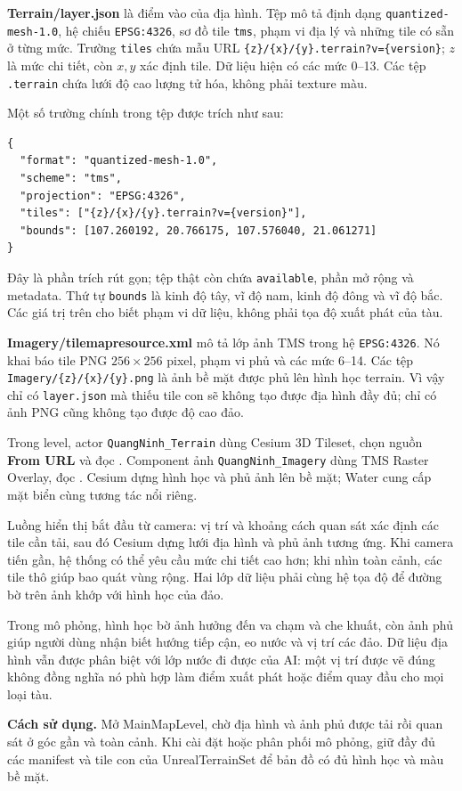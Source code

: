 \documentclass[11pt,a4paper,oneside]{report}
\newcommand{\howto}[1]{\par\smallskip\noindent\textbf{Cách sử dụng.} #1\par}
\begin{document}
\textbf{Terrain/layer.json} là điểm vào của địa hình. Tệp mô tả định dạng \texttt{quantized-mesh-1.0}, hệ chiếu \texttt{EPSG:4326}, sơ đồ tile \texttt{tms}, phạm vi địa lý và những tile có sẵn ở từng mức. Trường \texttt{tiles} chứa mẫu URL \verb|{z}/{x}/{y}.terrain?v={version}|; $z$ là mức chi tiết, còn $x,y$ xác định tile. Dữ liệu hiện có các mức 0--13. Các tệp \texttt{.terrain} chứa lưới độ cao lượng tử hóa, không phải texture màu.\cite{quantized}

Một số trường chính trong tệp được trích như sau:
\begin{lstlisting}
{
  "format": "quantized-mesh-1.0",
  "scheme": "tms",
  "projection": "EPSG:4326",
  "tiles": ["{z}/{x}/{y}.terrain?v={version}"],
  "bounds": [107.260192, 20.766175, 107.576040, 21.061271]
}
\end{lstlisting}
Đây là phần trích rút gọn; tệp thật còn chứa \texttt{available}, phần mở rộng và metadata. Thứ tự \texttt{bounds} là kinh độ tây, vĩ độ nam, kinh độ đông và vĩ độ bắc. Các giá trị trên cho biết phạm vi dữ liệu, không phải tọa độ xuất phát của tàu.

\textbf{Imagery/tilemapresource.xml} mô tả lớp ảnh TMS trong hệ \texttt{EPSG:4326}. Nó khai báo tile PNG $256\times256$ pixel, phạm vi phủ và các mức 6--14. Các tệp \texttt{Imagery/\{z\}/\{x\}/\{y\}.png} là ảnh bề mặt được phủ lên hình học terrain. Vì vậy chỉ có \texttt{layer.json} mà thiếu tile con sẽ không tạo được địa hình đầy đủ; chỉ có ảnh PNG cũng không tạo được độ cao đảo.

Trong level, actor \texttt{QuangNinh\_Terrain} dùng Cesium 3D Tileset, chọn nguồn \textbf{From URL} và đọc . Component ảnh \texttt{QuangNinh\_Imagery} dùng TMS Raster Overlay, đọc . Cesium dựng hình học và phủ ảnh lên bề mặt; Water cung cấp mặt biển cùng tương tác nổi riêng.\cite{cesiumfaq}

Luồng hiển thị bắt đầu từ camera: vị trí và khoảng cách quan sát xác định các tile cần tải, sau đó Cesium dựng lưới địa hình và phủ ảnh tương ứng. Khi camera tiến gần, hệ thống có thể yêu cầu mức chi tiết cao hơn; khi nhìn toàn cảnh, các tile thô giúp bao quát vùng rộng. Hai lớp dữ liệu phải cùng hệ tọa độ để đường bờ trên ảnh khớp với hình học của đảo.

Trong mô phỏng, hình học bờ ảnh hưởng đến va chạm và che khuất, còn ảnh phủ giúp người dùng nhận biết hướng tiếp cận, eo nước và vị trí các đảo. Dữ liệu địa hình vẫn được phân biệt với lớp nước đi được của AI: một vị trí được vẽ đúng không đồng nghĩa nó phù hợp làm điểm xuất phát hoặc điểm quay đầu cho mọi loại tàu.
\howto{Mở MainMapLevel, chờ địa hình và ảnh phủ được tải rồi quan sát ở góc gần và toàn cảnh. Khi cài đặt hoặc phân phối mô phỏng, giữ đầy đủ các manifest và tile con của UnrealTerrainSet để bản đồ có đủ hình học và màu bề mặt.}
\end{document}
